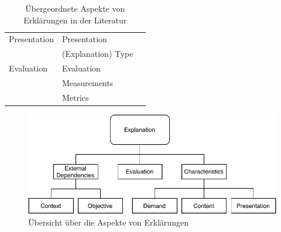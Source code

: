 \begin{table}
\begin{tabular}{|p{}|p{}|p{}|}
            Presentation    & Presentation          & \cite{rosenfeld_explainability_2019,kouki_user_2017} \\
                            & (Explanation) Type    & \cite{ribera2019can} \cite{rosenfeld_explainability_2019} \\
            \hline
            Evaluation      & Evaluation            & \cite{kohl_explainability_2019} \cite{doshi2017towards} \\
                            & Measurements          & \cite{waa_evaluating_2021} \cite{balog_measuring_2020} \\
                            & Metrics               & \cite{nunes_systematic_2017} \cite{anjomshoae2019explainable}
                                                      \cite{chari_explanation_2020} \cite{waa_evaluating_2021}\\
            \hline
        \end{tabular}
    \caption{Übergeordnete Aspekte von Erklärungen in der Literatur}
    \label{tab:model_explaination_aspects}
\end{table}

\begin{figure}[htb!]
    \includegraphics[width=0.8\linewidth]{contents/05_model_description/res/model-overview.pdf}
    \caption{Übersicht über die Aspekte von Erklärungen}
    \label{fig:model_overview}
\end{figure}

\newpage







